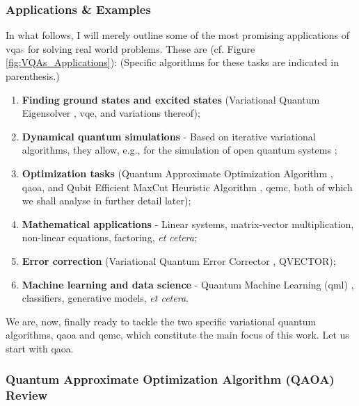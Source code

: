 \subsubsection*{\small Applications \& Examples}
In what follows, I will merely outline some of the most promising applications of \acrshort{vqa}\textcolor{gray}{s} for solving real world problems. These are (cf. Figure \ref{fig:VQAs_Applications}): (Specific algorithms for these tasks are indicated in parenthesis.)
\begin{enumerate}
    \item \textbf{Finding ground states and excited states} (Variational Quantum Eigensolver \cite{Peruzzo_2014}, \acrshort{vqe}, and variations thereof);
    \item  \textbf{Dynamical quantum simulations} - Based on iterative variational algorithms, they allow, e.g., for the simulation of open quantum systems \cite{Cerezo_2021};
    \item \textbf{Optimization tasks} (Quantum Approximate Optimization Algorithm \cite{farhi2014quantum}, \acrshort{qaoa}, and Qubit Efficient MaxCut Heuristic Algorithm \cite{tenecohen2023variational}, \acrshort{qemc}, both of which we shall analyse in further detail later);
    \item \textbf{Mathematical applications} \cite{Cerezo_2021} - Linear systems, matrix-vector multiplication, non-linear equations, factoring, \textit{et cetera};
    \item \textbf{Error correction} (Variational Quantum Error Corrector \cite{johnson2017qvector}, QVECTOR);
    \item \textbf{Machine learning and data science} - Quantum Machine Learning (\acrshort{qml}) \cite{Cerezo2022_QML}, classifiers, generative models, \textit{et cetera}.
\end{enumerate}

We are, now, finally ready to tackle the two specific variational quantum algorithms, \acrshort{qaoa} and \acrshort{qemc}, which constitute the main focus of this work. Let us start with \acrshort{qaoa}.

\subsubsection{Quantum Approximate Optimization Algorithm (QAOA) Review}
\label{subsubsection:QAOA}


